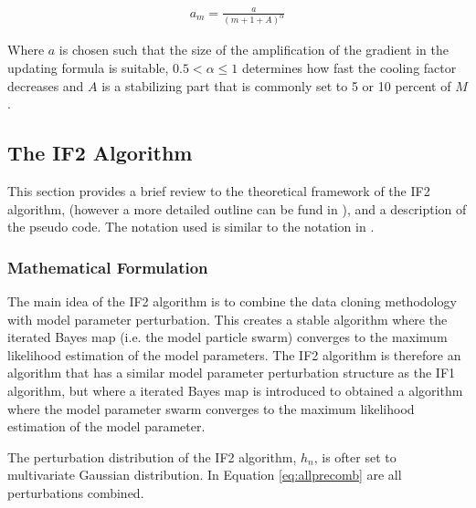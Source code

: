 \documentclass[twoside,openright]{report}
\begin{document}
\begin{align}
    a_m = \frac{a}{(m + 1 + A)^{\alpha}}
\end{align}

Where $a$ is chosen such that the size of the amplification of the gradient in the updating formula is suitable, $ 0.5 < \alpha \leq 1$  determines how fast the cooling factor decreases and  $A$ is a stabilizing part that is commonly set to 5 or 10 percent of $M$ \cite{spall2005introduction}.   





\subsection{The IF2 Algorithm}
This section provides a brief review to the theoretical framework of the IF2 algorithm, (however a more detailed outline can be fund in \cite{ionides2015inference}), and a description of the pseudo code. The notation used is similar to the notation in \cite{ionides2015inference}. 


\subsubsection{Mathematical Formulation}
The main idea of the IF2 algorithm is to combine the data cloning methodology with model parameter perturbation. This creates a stable algorithm where the iterated Bayes map (i.e. the model particle swarm) converges to the maximum likelihood estimation of the model parameters. The IF2 algorithm is therefore an algorithm that has a similar model parameter perturbation structure as the IF1 algorithm, but where a iterated Bayes map is introduced to obtained a algorithm where the model parameter swarm converges to the maximum likelihood estimation of the model parameter. \cite{ionides2015inference}

The perturbation distribution of the IF2 algorithm, $h_n$, is ofter set to multivariate Gaussian distribution. In Equation \ref{eq:allprecomb} are all perturbations combined.
\end{document}
